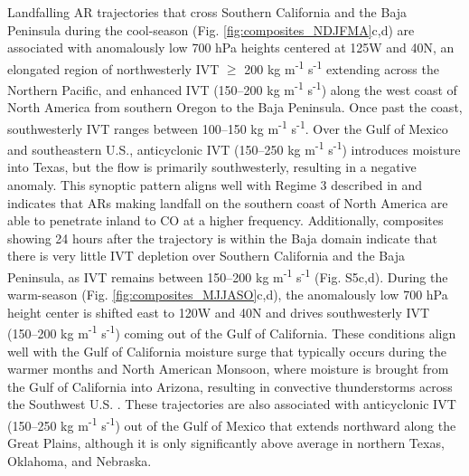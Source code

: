 \documentclass[draft]{agujournal2019}
\begin{document}
Landfalling AR trajectories that cross Southern California and the Baja Peninsula during the cool-season (Fig. \ref{fig:composites_NDJFMA}c,d) are associated with anomalously low 700 hPa heights centered at 125\textdegree W and 40\textdegree N, an elongated region of northwesterly IVT $\geq$ 200 kg m\textsuperscript{-1} s\textsuperscript{-1} extending across the Northern Pacific, and enhanced IVT (150--200 kg m\textsuperscript{-1} s\textsuperscript{-1}) along the west coast of North America from southern Oregon to the Baja Peninsula. Once past the coast, southwesterly IVT ranges between 100--150 kg m\textsuperscript{-1} s\textsuperscript{-1}. Over the Gulf of Mexico and southeastern U.S., anticyclonic IVT (150--250 kg m\textsuperscript{-1} s\textsuperscript{-1}) introduces moisture into Texas, but the flow is primarily southwesterly, resulting in a negative anomaly. This synoptic pattern aligns well with Regime 3 described in  and indicates that ARs making landfall on the southern coast of North America are able to penetrate inland to CO at a higher frequency. Additionally, composites showing 24 hours after the trajectory is within the Baja domain indicate that there is very little IVT depletion over Southern California and the Baja Peninsula, as IVT remains between 150--200 kg m\textsuperscript{-1} s\textsuperscript{-1} (Fig. S5c,d). During the warm-season (Fig. \ref{fig:composites_MJJASO}c,d), the anomalously low 700 hPa height center is shifted east to 120\textdegree W and 40\textdegree N and drives southwesterly IVT (150--200 kg m\textsuperscript{-1} s\textsuperscript{-1}) coming out of the Gulf of California. These conditions align well with the Gulf of California moisture surge that typically occurs during the warmer months and North American Monsoon, where moisture is brought from the Gulf of California into Arizona, resulting in convective thunderstorms across the Southwest U.S. \cite{Higgins2004RelationshipsStates}. These trajectories are also associated with anticyclonic IVT (150--250 kg m\textsuperscript{-1} s\textsuperscript{-1}) out of the Gulf of Mexico that extends northward along the Great Plains, although it is only significantly above average in northern Texas, Oklahoma, and Nebraska. 


\end{document}
